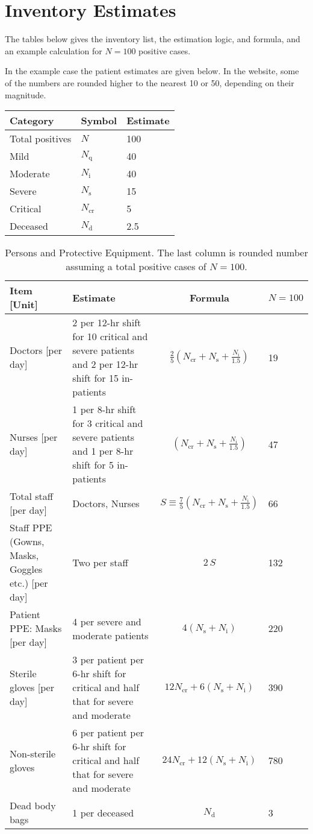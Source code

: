 \documentclass{article}
\newcommand{\nd}{\ensuremath{N_{\mathrm{d}}}}
\newcommand{\ncr}{\ensuremath{N_{\mathrm{cr}}}}
\newcommand{\ns}{\ensuremath{N_{\mathrm{s}}}}
\newcommand{\nin}{\ensuremath{N_{\mathrm{i}}}}
\newcommand{\nq}{\ensuremath{N_{\mathrm{q}}}}
\begin{document}
\section{Inventory Estimates}
The tables below gives the inventory list, the estimation logic, and
formula, and an example calculation for $N=100$ positive cases.

In the example case the patient estimates are given below. In the
website, some of the numbers are rounded higher to the nearest 10 or
50, depending on their magnitude.

\noindent
\begin{tabular}{lll}
  \toprule
  Category & Symbol & Estimate \\
  \midrule
  Total positives & $N$ & 100 \\
  Mild & $\nq$ & 40 \\
  Moderate & $\nin$ & 40 \\
  Severe & $\ns$ & 15 \\
  Critical & $\ncr$ & 5\\
  Deceased & $\nd$ & 2.5\\
  \bottomrule
\end{tabular}


\begin{landscape}
\begin{table}
  \caption{Persons and Protective Equipment. The last column is
    rounded number assuming a total positive cases of $N=100$.}
  \begin{tabularx}{\linewidth}{XXcl}
    \toprule
    Item [Unit] & Estimate & Formula & $N=100$ \\
    \midrule
Doctors [per day] & 2 per 12-hr shift for 10 critical and severe
patients and 2 
per 12-hr shift for 15 in-patients &
$\frac{2}{5}\left(\ncr+\ns+\frac{\nin}{1.5}\right)$ & 19 \\
Nurses [per day] & 1 per 8-hr shift for 3 critical and severe patients
and 1 per 8-hr shift for 5 in-patients &
$\left(\ncr+\ns+\frac{\nin}{1.5}\right)$ & 47\\
Total staff [per day]& Doctors, Nurses &
$S \equiv \frac{7}{5} \left(\ncr+\ns+\frac{\nin}{1.5}\right)$ & 66 \\
Staff PPE (Gowns, Masks, Goggles etc.) [per day]&
Two per staff & $2 \, S$  & 132\\
Patient PPE: Masks [per day] & 4 per severe and moderate patients &
$4 (\ns+\nin)$ & 220 \\
Sterile gloves [per day]&
 3 per patient per 6-hr shift for critical and half that for severe and
 moderate &
$12\ncr + 6 (\ns+\nin)$ & 390 \\
Non-sterile gloves &
 6 per patient per 6-hr shift for critical and half that for severe and
 moderate &
$24\ncr + 12 (\ns+\nin)$ & 780 \\
Dead body bags & 1 per deceased & $\nd$ & 3 \\
    \bottomrule
  \end{tabularx}
\end{table}
\end{landscape}
\end{document}
